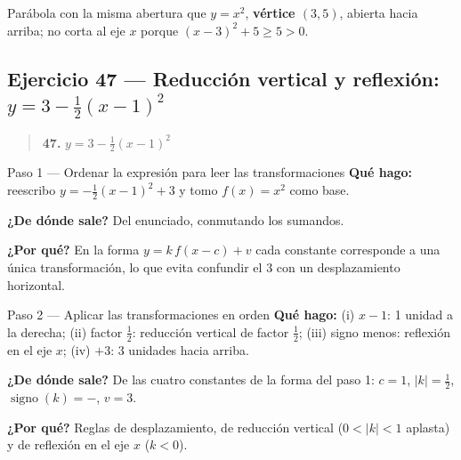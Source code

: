 \documentclass[11pt]{article}
\begin{document}
\begin{resp}
Parábola con la misma abertura que $y=x^2$, \textbf{vértice $(3,5)$}, abierta hacia arriba; no corta al eje $x$ porque $(x-3)^2+5\ge 5>0$.
\end{resp}

\subsection*{Ejercicio 47 — Reducción vertical y reflexión: $y=3-\tfrac12(x-1)^2$}

\begin{quote}
\textbf{47.} $y=3-\tfrac12(x-1)^2$
\end{quote}

\begin{paso}{Paso 1 --- Ordenar la expresión para leer las transformaciones}
\textbf{Qué hago:} reescribo $y=-\tfrac12(x-1)^2+3$ y tomo $f(x)=x^2$ como base.

\textbf{¿De dónde sale?} Del enunciado, conmutando los sumandos.

\textbf{¿Por qué?} En la forma $y=k\,f(x-c)+v$ cada constante corresponde a una única transformación, lo que evita confundir el $3$ con un desplazamiento horizontal.
\end{paso}

\begin{paso}{Paso 2 --- Aplicar las transformaciones en orden}
\textbf{Qué hago:} (i) $x-1$: 1 unidad a la derecha; (ii) factor $\tfrac12$: reducción vertical de factor $\tfrac12$; (iii) signo menos: reflexión en el eje $x$; (iv) $+3$: 3 unidades hacia arriba.

\textbf{¿De dónde sale?} De las cuatro constantes de la forma del paso 1: $c=1$, $|k|=\tfrac12$, $\operatorname{signo}(k)=-$, $v=3$.

\textbf{¿Por qué?} Reglas de desplazamiento, de reducción vertical ($0<|k|<1$ aplasta) y de reflexión en el eje $x$ ($k<0$).
\end{paso}
\end{document}
